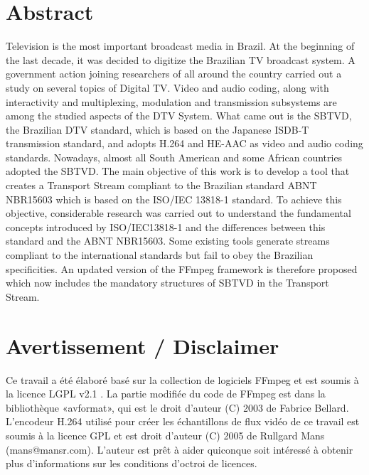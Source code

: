 \documentclass[12pt,a4paper]{article}
\begin{document}
\section*{Abstract}
Television is the most important broadcast media in Brazil. At the beginning of the last decade, it was decided to digitize the Brazilian TV broadcast system. A government action joining researchers of all around the country carried out a study on several topics of Digital TV. Video and audio coding, along with interactivity and multiplexing, modulation and transmission subsystems are among the studied aspects of the DTV System. What came out is the SBTVD, the Brazilian DTV standard, which is based on the Japanese ISDB-T transmission standard, and adopts H.264 and HE-AAC as video and audio coding standards. Nowadays, almost all South American and some African countries adopted the SBTVD. The main objective of this work is to develop a tool that creates a Transport Stream compliant to the Brazilian standard ABNT NBR15603 which is based on the ISO/IEC 13818-1 standard. To achieve this objective, considerable research was carried out to understand the fundamental concepts introduced by ISO/IEC13818-1 and the differences between this standard and the ABNT NBR15603. Some existing tools generate streams compliant to the international standards but fail to obey the Brazilian specificities. An updated version of the FFmpeg framework is therefore proposed which now includes the mandatory structures of SBTVD in the Transport Stream.


\newpage
\listoffigures  %
\listoftables   %
\newpage
\TBsommaire

\section*{Avertissement / Disclaimer}

\-\newline
Ce travail a été élaboré basé sur la collection de logiciels FFmpeg \cite{ffmpeg} et est soumis à la licence LGPL v2.1 \cite{gplv2}. La partie modifiée du code de FFmpeg est dans la bibliothèque «avformat», qui est le droit d'auteur (C) 2003 de Fabrice Bellard. L'encodeur H.264 utilisé pour créer les échantillons de flux vidéo de ce travail est soumis à la licence GPL et est droit d'auteur (C) 2005 de Rullgard Mans (mans@mansr.com). L'auteur est prêt à aider quiconque soit intéressé à obtenir plus d'informations sur les conditions d'octroi de licences.
\end{document}

